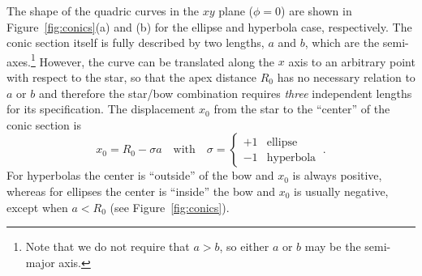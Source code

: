 \documentclass[useAMS, usenatbib, a4paper]{mnras}
\begin{document}


The shape of the quadric curves in the \(xy\) plane (\(\phi = 0\)) are
shown in Figure~\ref{fig:conics}(a) and (b) for the ellipse and
hyperbola case, respectively.  The conic section itself is fully
described by two lengths, \(a\) and \(b\), which are the
semi-axes.\footnote{Note that we do not require that \(a > b\), so
  either \(a\) or \(b\) may be the semi-major axis.}  However, the
curve can be translated along the \(x\) axis to an arbitrary point
with respect to the star, so that the apex distance \(R_0\) has no
necessary relation to \(a\) or \(b\) and therefore the star/bow
combination requires \emph{three} independent lengths for its
specification.  The displacement \(x_0\) from the star to the
``center'' of the conic section is
\begin{equation}
  \label{eq:conic-x0}
  x_0 = R_0 - \sigma a
  \quad \text{with} \quad
  \sigma = \begin{cases}
    +1 & \text{ellipse}\\
    -1 & \text{hyperbola}
  \end{cases} \ .
\end{equation}
For hyperbolas the center is ``outside'' of the bow and \(x_0\) is
always positive, whereas for ellipses the center is ``inside'' the bow
and \(x_0\) is usually negative, except when \(a < R_0\) (see
Figure~\ref{fig:conics}).
\end{document}
